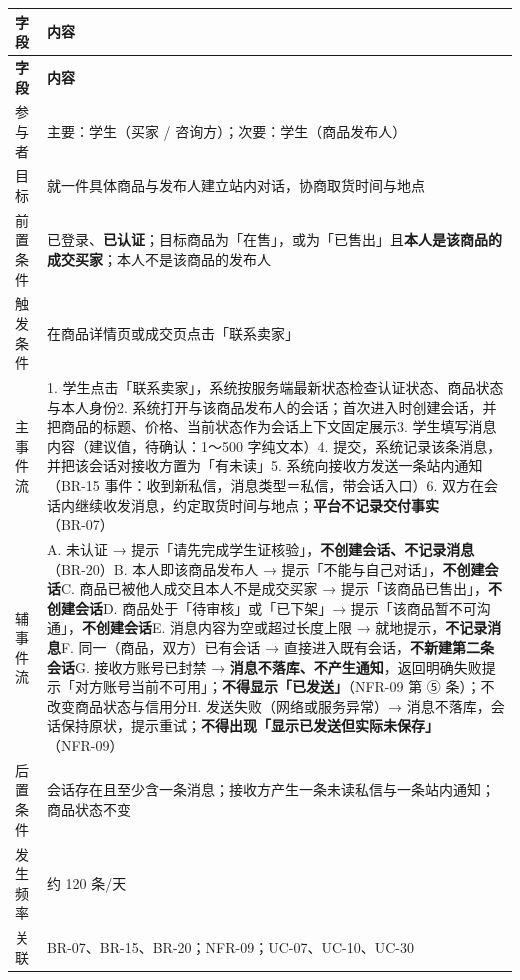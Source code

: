 \documentclass[12pt,a4paper]{ctexart}
\begin{document}
{\scriptsize
\begin{longtable}{|p{2.75cm}|p{13.25cm}|}
\hline
\textbf{字段} & \textbf{内容} \\
\hline
\endfirsthead
\hline
\textbf{字段} & \textbf{内容} \\
\hline
\endhead
\hline
\endfoot
参与者 & 主要：学生（买家 / 咨询方）；次要：学生（商品发布人） \\
\hline
目标 & 就一件具体商品与发布人建立站内对话，协商取货时间与地点 \\
\hline
前置条件 & 已登录、\textbf{已认证}；目标商品为「在售」，或为「已售出」且\textbf{本人是该商品的成交买家}；本人不是该商品的发布人 \\
\hline
触发条件 & 在商品详情页或成交页点击「联系卖家」 \\
\hline
主事件流 & 1. 学生点击「联系卖家」，系统按服务端最新状态检查认证状态、商品状态与本人身份\newline{}2. 系统打开与该商品发布人的会话；首次进入时创建会话，并把商品的标题、价格、当前状态作为会话上下文固定展示\newline{}3. 学生填写消息内容（建议值，待确认：1～500 字纯文本）\newline{}4. 提交，系统记录该条消息，并把该会话对接收方置为「有未读」\newline{}5. 系统向接收方发送一条站内通知（BR-15 事件：收到新私信，消息类型＝私信，带会话入口）\newline{}6. 双方在会话内继续收发消息，约定取货时间与地点；\textbf{平台不记录交付事实}（BR-07） \\
\hline
辅事件流 & A. 未认证 → 提示「请先完成学生证核验」，\textbf{不创建会话、不记录消息}（BR-20）\newline{}B. 本人即该商品发布人 → 提示「不能与自己对话」，\textbf{不创建会话}\newline{}C. 商品已被他人成交且本人不是成交买家 → 提示「该商品已售出」，\textbf{不创建会话}\newline{}D. 商品处于「待审核」或「已下架」→ 提示「该商品暂不可沟通」，\textbf{不创建会话}\newline{}E. 消息内容为空或超过长度上限 → 就地提示，\textbf{不记录消息}\newline{}F. 同一（商品，双方）已有会话 → 直接进入既有会话，\textbf{不新建第二条会话}\newline{}G. 接收方账号已封禁 → \textbf{消息不落库、不产生通知}，返回明确失败提示「对方账号当前不可用」；\textbf{不得显示「已发送」}（NFR-09 第 ⑤ 条）；不改变商品状态与信用分\newline{}H. 发送失败（网络或服务异常）→ 消息不落库，会话保持原状，提示重试；\textbf{不得出现「显示已发送但实际未保存」}（NFR-09） \\
\hline
后置条件 & 会话存在且至少含一条消息；接收方产生一条未读私信与一条站内通知；商品状态不变 \\
\hline
发生频率 & 约 120 条/天 \\
\hline
关联 & BR-07、BR-15、BR-20；NFR-09；UC-07、UC-10、UC-30 \\
\hline
\end{longtable}
}
\end{document}
